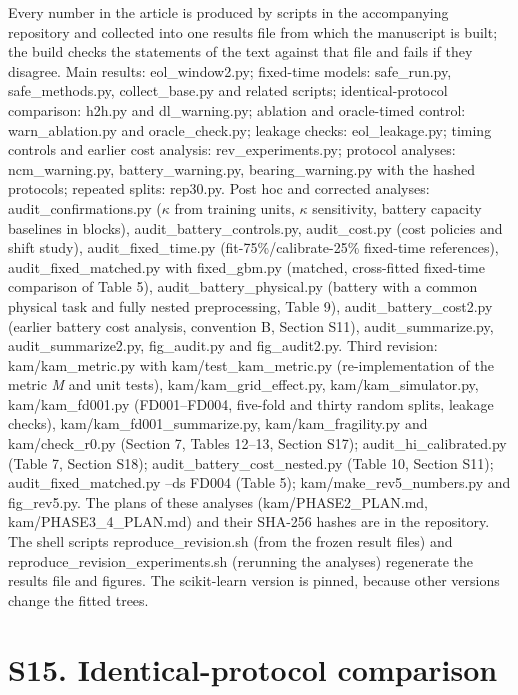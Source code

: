\documentclass[11pt,a4paper]{article}
\begin{document}
\noindent Every number in the article is produced by scripts in the accompanying repository and collected into one results file from which the manuscript is built; the build checks the statements of the text against that file and fails if they disagree. Main results: eol\_window2.py; fixed-time models: safe\_run.py, safe\_methods.py, collect\_base.py and related scripts; identical-protocol comparison: h2h.py and dl\_warning.py; ablation and oracle-timed control: warn\_ablation.py and oracle\_check.py; leakage checks: eol\_leakage.py; timing controls and earlier cost analysis: rev\_experiments.py; protocol analyses: ncm\_warning.py, battery\_warning.py, bearing\_warning.py with the hashed protocols; repeated splits: rep30.py. Post hoc and corrected analyses: audit\_confirmations.py ($\kappa$ from training units, $\kappa$ sensitivity, battery capacity baselines in blocks), audit\_battery\_controls.py, audit\_cost.py (cost policies and shift study), audit\_fixed\_time.py (fit-75\%/calibrate-25\% fixed-time references), audit\_fixed\_matched.py with fixed\_gbm.py (matched, cross-fitted fixed-time comparison of Table 5), audit\_battery\_physical.py (battery with a common physical task and fully nested preprocessing, Table 9), audit\_battery\_cost2.py (earlier battery cost analysis, convention B, Section S11), audit\_summarize.py, audit\_summarize2.py, fig\_audit.py and fig\_audit2.py. Third revision: kam/kam\_metric.py with kam/test\_kam\_metric.py (re-implementation of the metric \textit{M} and unit tests), kam/kam\_grid\_effect.py, kam/kam\_simulator.py, kam/kam\_fd001.py (FD001--FD004, five-fold and thirty random splits, leakage checks), kam/kam\_fd001\_summarize.py, kam/kam\_fragility.py and kam/check\_r0.py (Section 7, Tables 12--13, Section S17); audit\_hi\_calibrated.py (Table 7, Section S18); audit\_battery\_cost\_nested.py (Table 10, Section S11); audit\_fixed\_matched.py --ds FD004 (Table 5); kam/make\_rev5\_numbers.py and fig\_rev5.py. The plans of these analyses (kam/PHASE2\_PLAN.md, kam/PHASE3\_4\_PLAN.md) and their SHA-256 hashes are in the repository. The shell scripts reproduce\_revision.sh (from the frozen result files) and reproduce\_revision\_experiments.sh (rerunning the analyses) regenerate the results file and figures. The scikit-learn version is pinned, because other versions change the fitted trees.

\section*{S15. Identical-protocol comparison}
\end{document}
